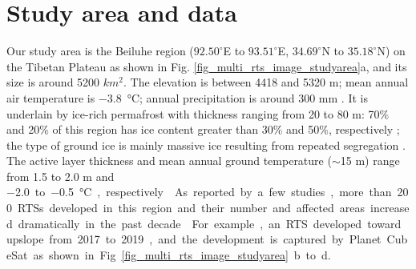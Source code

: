 \documentclass[authoryear,preprint,review,12pt]{elsarticle}
\begin{document}
\section{Study area and data}
\label{sec_studyarea_data}

Our study area is the Beiluhe region ($92.50^\circ$E to $93.51^\circ$E, $34.69^\circ$N to $35.18^\circ$N) on the Tibetan Plateau as shown in Fig. \ref{fig_multi_rts_image_studyarea}a, and its size is around 5200 $km^2$.
The elevation is between 4418 and 5320 m; mean annual air temperature is \SI{-3.8}{\celsius}; annual precipitation is around 300 mm  \citep{luo_thermokarst_2015}.
It is underlain by ice-rich permafrost with thickness ranging from 20 to 80 m: 70\% and 20\% of this region has ice content greater than 30\% and 50\%, respectively \citep{zhou_geocryology_2000, luo_thermokarst_2015}; 
the type of ground ice is mainly massive ice resulting from repeated segregation \citep{guodong1983mechanism}. 
The active layer thickness and mean annual ground temperature ($\sim$15 m) range from 1.5 to 2.0 m and \SI{-2.0} to \SI{-0.5}{\celsius}, respectively \citep{zhou_geocryology_2000, wu2010changes, luo_thermokarst_2015,  wu2015changes}. 
As reported by a few studies, more than 200 RTSs developed in this region and their number and affected areas increased dramatically in the past decade \citep{huang2020using,luo2019recent}.  
For example, an RTS developed toward upslope from 2017 to 2019, and the development is captured by Planet CubeSat as shown in Fig. \ref{fig_multi_rts_image_studyarea}b to d. 

\end{document}
